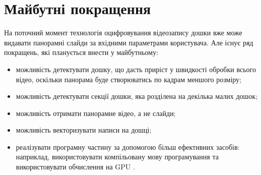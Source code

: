 \section{Майбутні покращення}

На поточний момент технологія оцифровування відеозапису дошки вже може
видавати панорамні слайди за вхідними параметрами користувача. Але існує
ряд покращень, які планується внести у майбутньому:

\begin{itemize}
    \item можливість детектувати дошку, що дасть приріст у швидкості обробки
          всього відео, оскільки панорама буде створюватись по кадрам меншого розміру;
    \item можливість детектувати секції дошки, яка розділена на декілька малих дошок;
    \item можливість отримати панорамне відео, а не слайди;
    \item можливість векторизувати написи на дошці;
    \item реалізувати програмну частину за допомогою більш ефективних засобів:
      наприклад, використовувати компільовану мову програмування
      та використовувати обчислення на GPU \cite{cuda,opencl}.
\end{itemize}

\clearpage
